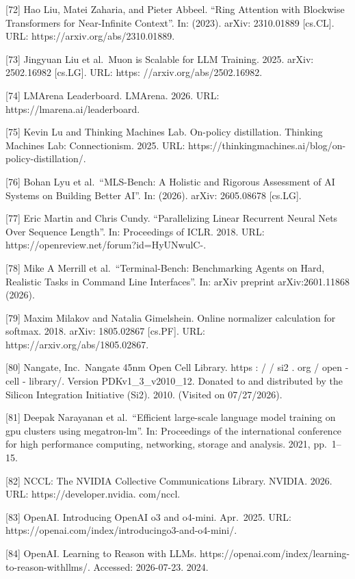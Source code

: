 {[}72{]} Hao Liu, Matei Zaharia, and Pieter Abbeel. ``Ring Attention
with Blockwise Transformers for Near-Infinite Context''. In: (2023).
arXiv: 2310.01889 {[}cs.CL{]}. URL: https://arxiv.org/abs/2310.01889.

{[}73{]} Jingyuan Liu et al.~Muon is Scalable for LLM Training. 2025.
arXiv: 2502.16982 {[}cs.LG{]}. URL: https: //arxiv.org/abs/2502.16982.

{[}74{]} LMArena Leaderboard. LMArena. 2026. URL:
https://lmarena.ai/leaderboard.

{[}75{]} Kevin Lu and Thinking Machines Lab. On-policy distillation.
Thinking Machines Lab: Connectionism. 2025. URL:
https://thinkingmachines.ai/blog/on-policy-distillation/.

{[}76{]} Bohan Lyu et al.~``MLS-Bench: A Holistic and Rigorous
Assessment of AI Systems on Building Better AI''. In: (2026). arXiv:
2605.08678 {[}cs.LG{]}.

{[}77{]} Eric Martin and Chris Cundy. ``Parallelizing Linear Recurrent
Neural Nets Over Sequence Length''. In: Proceedings of ICLR. 2018. URL:
https://openreview.net/forum?id=HyUNwulC-.

{[}78{]} Mike A Merrill et al.~``Terminal-Bench: Benchmarking Agents on
Hard, Realistic Tasks in Command Line Interfaces''. In: arXiv preprint
arXiv:2601.11868 (2026).

{[}79{]} Maxim Milakov and Natalia Gimelshein. Online normalizer
calculation for softmax. 2018. arXiv: 1805.02867 {[}cs.PF{]}. URL:
https://arxiv.org/abs/1805.02867.

{[}80{]} Nangate, Inc.~Nangate 45nm Open Cell Library. https : / / si2 .
org / open - cell - library/. Version PDKv1\_3\_v2010\_12. Donated to
and distributed by the Silicon Integration Initiative (Si2). 2010.
(Visited on 07/27/2026).

{[}81{]} Deepak Narayanan et al.~``Efficient large-scale language model
training on gpu clusters using megatron-lm''. In: Proceedings of the
international conference for high performance computing, networking,
storage and analysis. 2021, pp.~1--15.

{[}82{]} NCCL: The NVIDIA Collective Communications Library. NVIDIA.
2026. URL: https://developer.nvidia. com/nccl.

{[}83{]} OpenAI. Introducing OpenAI o3 and o4-mini. Apr.~2025. URL:
https://openai.com/index/introducingo3-and-o4-mini/.

{[}84{]} OpenAI. Learning to Reason with LLMs.
https://openai.com/index/learning-to-reason-withllms/. Accessed:
2026-07-23. 2024.

